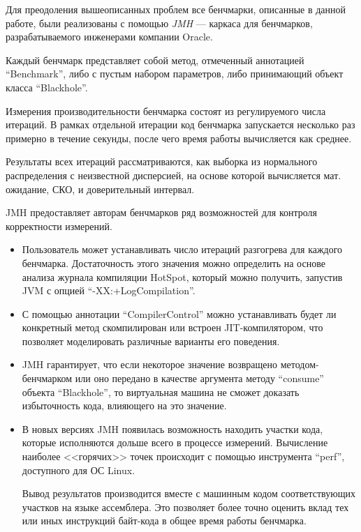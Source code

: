 Для преодоления вышеописанных проблем все бенчмарки, описанные в данной работе, были реализованы
с помощью \textit{JMH}
--- каркаса для бенчмарков, разрабатываемого инженерами компании Oracle.

Каждый бенчмарк  представляет собой метод, отмеченный аннотацией ``Benchmark'', либо с пустым
набором параметров, либо принимающий объект класса ``Blackhole''.

Измерения производительности бенчмарка состоят из регулируемого числа итераций.
В рамках отдельной итерации код бенчмарка запускается несколько раз примерно в течение секунды,
после чего время работы вычисляется как среднее.

Результаты всех итераций рассматриваются, как выборка из нормального распределения с неизвестной
дисперсией, на основе которой вычисляется мат. ожидание, СКО, и доверительный интервал.

JMH предоставляет авторам бенчмарков ряд возможностей для контроля корректности измерений.
\begin{itemize}
    \item Пользователь может устанавливать число итераций разгогрева для каждого бенчмарка.
    Достаточность этого значения можно определить на основе анализа журнала компиляции HotSpot,
    который можно получить, запустив JVM с опцией ``-XX:+LogCompilation''.

    \item С помощью аннотации ``CompilerControl'' можно устанавливать будет ли конкретный метод
    скомпилирован или встроен JIT-компилятором, что позволяет моделировать различные варианты
    его поведения.

    \item JMH гарантирует, что если некоторое значение возвращено методом-бенчмарком или оно
    передано в качестве аргумента методу ``consume'' объекта ``Blackhole'', то виртуальная машина
    не сможет доказать избыточность кода, влияющего на это значение.

    \item В новых версиях JMH появилась возможность находить участки кода, которые исполняются
    дольше всего в процессе измерений.
    Вычисление наиболее <<горячих>> точек происходит с помощью инструмента ``perf'',
    доступного для ОС Linux.

    Вывод результатов производится вместе с машинным кодом соответствующих участков на языке
    ассемблера.
    Это позволяет более точно оценить вклад тех или иных инструкций байт-кода в общее время работы
    бенчмарка.
\end{itemize}

